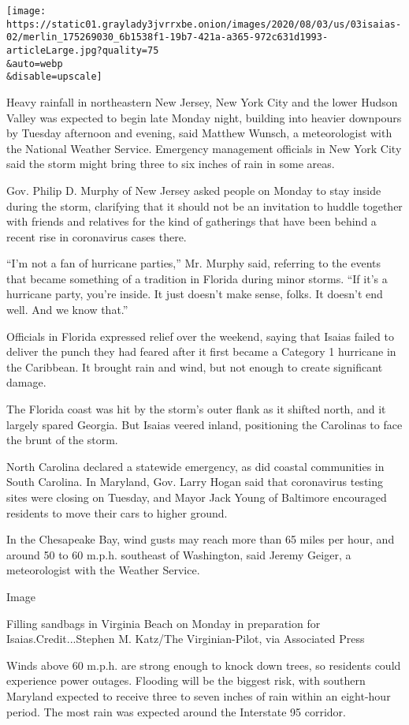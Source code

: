 \texttt{[image: https://static01.graylady3jvrrxbe.onion/images/2020/08/03/us/03isaias-02/merlin\_175269030\_6b1538f1-19b7-421a-a365-972c631d1993-articleLarge.jpg?quality=75\\\&auto=webp\\\&disable=upscale]}

Heavy rainfall in northeastern New Jersey, New York City and the lower
Hudson Valley was expected to begin late Monday night, building into
heavier downpours by Tuesday afternoon and evening, said Matthew Wunsch,
a meteorologist with the National Weather Service. Emergency management
officials in New York City said the storm might bring three to six
inches of rain in some areas.

Gov. Philip D. Murphy of New Jersey asked people on Monday to stay
inside during the storm, clarifying that it should not be an invitation
to huddle together with friends and relatives for the kind of gatherings
that have been behind a recent rise in coronavirus cases there.

``I'm not a fan of hurricane parties,'' Mr. Murphy said, referring to
the events that became something of a tradition in Florida during minor
storms. ``If it's a hurricane party, you're inside. It just doesn't make
sense, folks. It doesn't end well. And we know that.''

Officials in Florida expressed relief over the weekend, saying that
Isaias failed to deliver the punch they had feared after it first became
a Category 1 hurricane in the Caribbean. It brought rain and wind, but
not enough to create significant damage.

The Florida coast was hit by the storm's outer flank as it shifted
north, and it largely spared Georgia. But Isaias veered inland,
positioning the Carolinas to face the brunt of the storm.

North Carolina declared a statewide emergency, as did coastal
communities in South Carolina. In Maryland, Gov. Larry Hogan said that
coronavirus testing sites were closing on Tuesday, and Mayor Jack Young
of Baltimore encouraged residents to move their cars to higher ground.

In the Chesapeake Bay, wind gusts may reach more than 65 miles per hour,
and around 50 to 60 m.p.h. southeast of Washington, said Jeremy Geiger,
a meteorologist with the Weather Service.

Image

Filling sandbags in Virginia Beach on Monday in preparation for
Isaias.Credit...Stephen M. Katz/The Virginian-Pilot, via Associated
Press

Winds above 60 m.p.h. are strong enough to knock down trees, so
residents could experience power outages. Flooding will be the biggest
risk, with southern Maryland expected to receive three to seven inches
of rain within an eight-hour period. The most rain was expected around
the Interstate 95 corridor.

